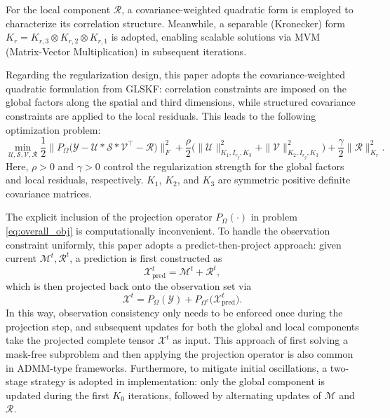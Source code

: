 \documentclass[a4paper,12pt]{article}
\numberwithin{equation}{section}
\numberwithin{algorithm}{section}
\theoremstyle{remark}
\theoremstyle{definition}
\begin{document}
For the local component $\mathcal{R}$, a covariance-weighted quadratic form is employed to characterize its correlation structure. Meanwhile, a separable (Kronecker) form
$K_r = K_{r,3}\otimes K_{r,2}\otimes K_{r,1}$ is adopted,
enabling scalable solutions via MVM (Matrix-Vector Multiplication) in subsequent iterations\cite{lei2024glskf,allen2014glsmd}.

Regarding the regularization design, this paper adopts the covariance-weighted quadratic formulation from GLSKF: correlation constraints are imposed on the global factors along the spatial and third dimensions, while structured covariance constraints are applied to the local residuals. This leads to the following optimization problem:
\begin{equation}
	\min_{\mathcal{U},\mathcal{S},\mathcal{V},\mathcal{R}}
	\frac{1}{2}\Big\|P_{\Omega}\big(\mathcal{Y}-\mathcal{U}*\mathcal{S}*\mathcal{V}^{\top}-\mathcal{R}\big)\Big\|_{F}^{2}
	+\frac{\rho}{2}\Big(\|\mathcal{U}\|^{2}_{K_1,I_{r_g},K_3}+\|\mathcal{V}\|^{2}_{K_2,I_{r_g},K_3}\Big)
	+\frac{\gamma}{2}\|\mathcal{R}\|^{2}_{K_r}.
	\label{eq:overall_obj}
\end{equation}
Here, $\rho>0$ and $\gamma>0$ control the regularization strength for the global factors and local residuals, respectively. $K_1$, $K_2$, and $K_3$ are symmetric positive definite covariance matrices.

The explicit inclusion of the projection operator $P_{\Omega}(\cdot)$ in problem \eqref{eq:overall_obj} is computationally inconvenient. To handle the observation constraint uniformly, this paper adopts a predict-then-project approach: given current $\mathcal{M}^t,\mathcal{R}^t$, a prediction is first constructed as
\begin{equation}
	\mathcal{X}_{\mathrm{pred}}^{t}=\mathcal{M}^{t}+\mathcal{R}^{t},
	\label{eq:xpred}
\end{equation}
which is then projected back onto the observation set via
\begin{equation}
	\mathcal{X}^{t}=P_{\Omega}(\mathcal{Y})+P_{\Omega^{c}}\big(\mathcal{X}_{\mathrm{pred}}^{t}\big).
	\label{eq:proj}
\end{equation}
In this way, observation consistency only needs to be enforced once during the projection step, and subsequent updates for both the global and local components take the projected complete tensor $\mathcal{X}^{t}$ as input. This approach of first solving a mask-free subproblem and then applying the projection operator is also common in ADMM-type frameworks\cite{boyd2011admm}. Furthermore, to mitigate initial oscillations, a two-stage strategy is adopted in implementation: only the global component is updated during the first $K_0$ iterations, followed by alternating updates of $\mathcal{M}$ and $\mathcal{R}$.
\end{document}
